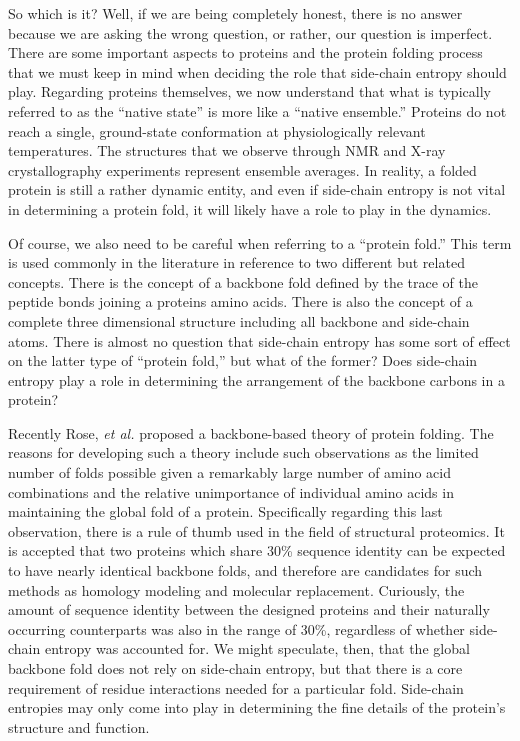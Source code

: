 So which is it? Well, if we are being completely honest, there is no answer because we are asking the wrong question, or rather, our question is imperfect. There are some important aspects to proteins and the protein folding process that we must keep in mind when deciding the role that side-chain entropy should play. Regarding proteins themselves, we now understand that what is typically referred to as the ``native state'' is more like a ``native ensemble.'' Proteins do not reach a single, ground-state conformation at physiologically relevant temperatures. The structures that we observe through NMR and X-ray crystallography experiments represent ensemble averages. In reality, a folded protein is still a rather dynamic entity, and even if side-chain entropy is not vital in determining a protein fold, it will likely have a role to play in the dynamics.

Of course, we also need to be careful when referring to a ``protein fold.'' This term is used commonly in the literature in reference to two different but related concepts. There is the concept of a backbone fold defined by the trace of the peptide bonds joining a proteins amino acids. There is also the concept of a complete three dimensional structure including all backbone and side-chain atoms. There is almost no question that side-chain entropy has some sort of effect on the latter type of ``protein fold,'' but what of the former? Does side-chain entropy play a role in determining the arrangement of the backbone carbons in a protein?

Recently Rose, \emph{et al.} proposed a backbone-based theory of protein folding\cite{Rose:2006p362}. The reasons for developing such a theory include such observations as the limited number of folds possible given a remarkably large number of amino acid combinations and the relative unimportance of individual amino acids in maintaining the global fold of a protein. Specifically regarding this last observation, there is a rule of thumb used in the field of structural proteomics. It is accepted that two proteins which share 30\% sequence identity can be expected to have nearly identical backbone folds, and therefore are candidates for such methods as homology modeling and molecular replacement. Curiously, the amount of sequence identity between the designed proteins and their naturally occurring counterparts was also in the range of 30\%, regardless of whether side-chain entropy was accounted for. We might speculate, then, that the global backbone fold does not rely on side-chain entropy, but that there is a core requirement of residue interactions needed for a particular fold. Side-chain entropies may only come into play in determining the fine details of the protein's structure and function.